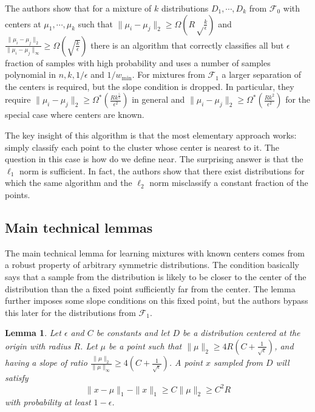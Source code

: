 \documentclass[11pt,letter]{article}
\newtheorem{lemma}{Lemma}
\begin{document}
The authors show that for a mixture of $k$ distributions $D_1, \cdots, D_k$ from $\mathcal F_0$ with centers at $\mu_1, \cdots, \mu_k$ such that $\| \mu_i - \mu_j \|_2 \geq \Omega\left(R \sqrt \frac k \epsilon \right)$ and $\frac{\|\mu_i - \mu_j\|_2}{\|\mu_i-\mu_j\|_{\infty}} \geq \Omega{\left( \sqrt{\frac{k}{\epsilon}}\right)}$ there is an algorithm that correctly classifies all but $\epsilon$ fraction of samples with high probability and uses a number of samples polynomial in $n, k, 1/\epsilon$ and $1/w_{\min}$. For mixtures from $\mathcal F_1$ a larger separation of the centers is required, but the slope condition is dropped. In particular, they require $\|\mu_i - \mu_j \|_2 \geq \Omega^* \left(\frac{Rk^{\frac{5}{2}}}{\epsilon^{2}}\right)$ in general and $\|\mu_i - \mu_j \|_2 \geq \Omega^* \left(\frac{Rk^{2}}{\epsilon^{2}}\right)$ for the special case where centers are known.

The key insight of this algorithm is that the most elementary approach works: simply classify each point to the cluster whose center is nearest to it. The question in this case is how do we define near. The surprising answer is that the $\ell_1$ norm is sufficient. In fact, the authors show that there exist distributions for which the same algorithm and the $\ell_2$ norm misclassify a constant fraction of the points. 

\subsection{Main technical lemmas}

The main technical lemma for learning mixtures with known centers comes from a robust property of arbitrary symmetric distributions. The condition basically says that a sample from the distribution is likely to be closer to the center of the distribution than the a fixed point sufficiently far from the center. The lemma further imposes some slope conditions on this fixed point, but the authors bypass this later for the distributions from $\mathcal F_1$. 

\begin{lemma} \label{lem:heavy-tail-lem1}
Let $\epsilon$ and $C$ be constants and let $D$ be a distribution centered at the origin with radius $R$. Let $\mu$ be a point such that $\|\mu\|_2 \geq 4R(C+\frac{1}{\sqrt{\epsilon}})$, and having a slope of ratio $\frac{\|\mu\|_2}{\|\mu\|_\infty} \geq 4(C+\frac{1}{\sqrt{\epsilon}})$. A point $x$ sampled from $D$ will satisfy 
\begin{equation*}
\|x-\mu\|_1 - \|x\|_1 \geq C\|\mu\|_2 \geq C^2R 
\end{equation*}
with probability at least $1-\epsilon$. 
 
\end{lemma} 
\end{document}
